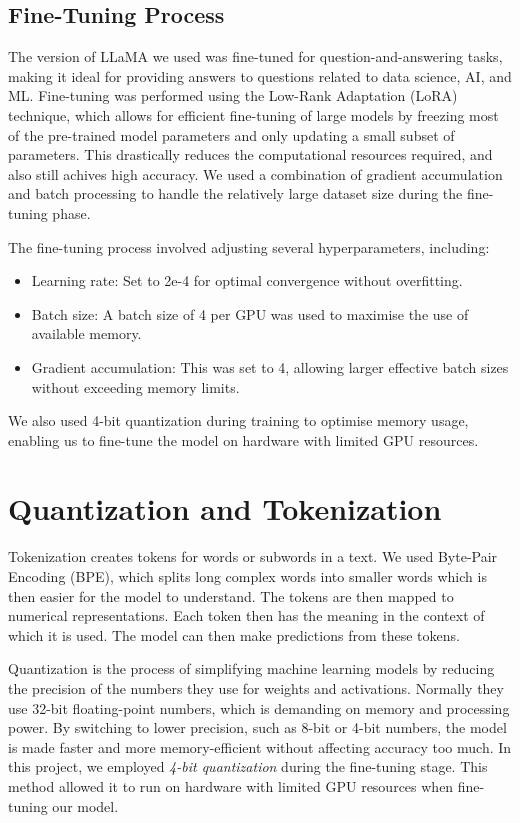 \documentclass[10pt]{article}
\begin{document}
\subsection{Fine-Tuning Process}

The version of LLaMA we used was fine-tuned for question-and-answering tasks, making it ideal for providing answers
to questions related to data science, AI, and ML.
Fine-tuning was performed using the Low-Rank Adaptation (LoRA) technique, which allows for efficient fine-tuning
of large models by freezing most of the pre-trained model parameters and only updating a small subset of parameters.
This drastically reduces the computational resources required, and also still achives high accuracy. We used
a combination of gradient accumulation and batch processing to handle the relatively large dataset size during
the fine-tuning phase.

The fine-tuning process involved adjusting several hyperparameters, including:
\begin{itemize}
    \item Learning rate: Set to 2e-4 for optimal convergence without overfitting.
    \item Batch size: A batch size of 4 per GPU was used to maximise the use of available memory.
    \item Gradient accumulation: This was set to 4, allowing larger effective batch sizes without exceeding memory limits.
\end{itemize}
We also used 4-bit quantization during training to optimise memory usage, enabling us to fine-tune the model on hardware with limited GPU resources.

\section{Quantization and Tokenization}

Tokenization creates tokens for words or subwords in a text.
We used Byte-Pair Encoding (BPE), which splits long complex words into smaller
words which is then easier for the model to understand. The tokens are then mapped to numerical
representations. Each token then has the meaning in the context of which it is used. The model
can then make predictions from these tokens.

Quantization is the process of simplifying machine learning models by reducing the
precision of the numbers they use for weights and activations. Normally they use 32-bit
floating-point numbers, which is demanding on memory and processing power. By switching to
lower precision, such as 8-bit or 4-bit numbers, the model is made faster and more
memory-efficient without affecting accuracy too much. In this project, we employed
\textit{4-bit quantization} during the fine-tuning stage. This method allowed it to
run on hardware with limited GPU resources when fine-tuning our model.
\end{document}

